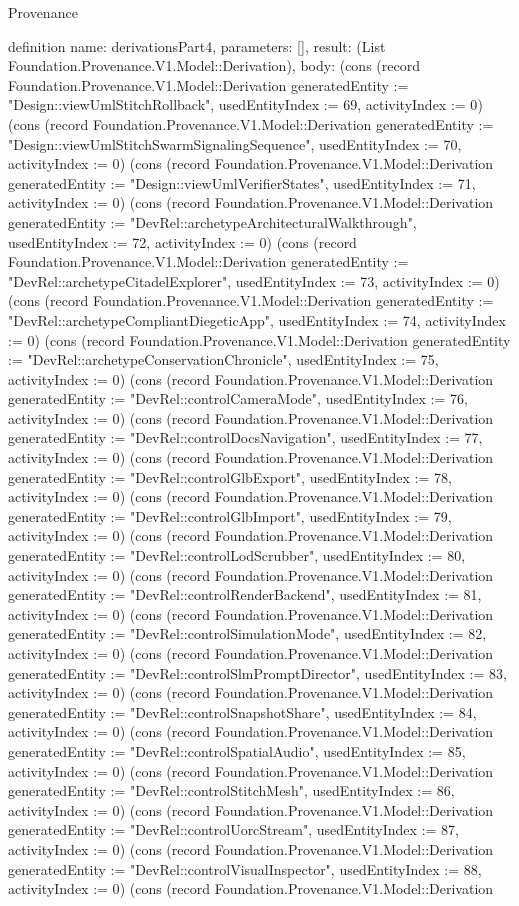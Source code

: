 \begin{lexlean}{Provenance}
\begin{semanticmodule}
definition{
  name: derivationsPart4,
  parameters: [],
  result: (List Foundation.Provenance.V1.Model::Derivation),
  body: (cons (record Foundation.Provenance.V1.Model::Derivation {generatedEntity := "Design::viewUmlStitchRollback", usedEntityIndex := 69, activityIndex := 0}) (cons (record Foundation.Provenance.V1.Model::Derivation {generatedEntity := "Design::viewUmlStitchSwarmSignalingSequence", usedEntityIndex := 70, activityIndex := 0}) (cons (record Foundation.Provenance.V1.Model::Derivation {generatedEntity := "Design::viewUmlVerifierStates", usedEntityIndex := 71, activityIndex := 0}) (cons (record Foundation.Provenance.V1.Model::Derivation {generatedEntity := "DevRel::archetypeArchitecturalWalkthrough", usedEntityIndex := 72, activityIndex := 0}) (cons (record Foundation.Provenance.V1.Model::Derivation {generatedEntity := "DevRel::archetypeCitadelExplorer", usedEntityIndex := 73, activityIndex := 0}) (cons (record Foundation.Provenance.V1.Model::Derivation {generatedEntity := "DevRel::archetypeCompliantDiegeticApp", usedEntityIndex := 74, activityIndex := 0}) (cons (record Foundation.Provenance.V1.Model::Derivation {generatedEntity := "DevRel::archetypeConservationChronicle", usedEntityIndex := 75, activityIndex := 0}) (cons (record Foundation.Provenance.V1.Model::Derivation {generatedEntity := "DevRel::controlCameraMode", usedEntityIndex := 76, activityIndex := 0}) (cons (record Foundation.Provenance.V1.Model::Derivation {generatedEntity := "DevRel::controlDocsNavigation", usedEntityIndex := 77, activityIndex := 0}) (cons (record Foundation.Provenance.V1.Model::Derivation {generatedEntity := "DevRel::controlGlbExport", usedEntityIndex := 78, activityIndex := 0}) (cons (record Foundation.Provenance.V1.Model::Derivation {generatedEntity := "DevRel::controlGlbImport", usedEntityIndex := 79, activityIndex := 0}) (cons (record Foundation.Provenance.V1.Model::Derivation {generatedEntity := "DevRel::controlLodScrubber", usedEntityIndex := 80, activityIndex := 0}) (cons (record Foundation.Provenance.V1.Model::Derivation {generatedEntity := "DevRel::controlRenderBackend", usedEntityIndex := 81, activityIndex := 0}) (cons (record Foundation.Provenance.V1.Model::Derivation {generatedEntity := "DevRel::controlSimulationMode", usedEntityIndex := 82, activityIndex := 0}) (cons (record Foundation.Provenance.V1.Model::Derivation {generatedEntity := "DevRel::controlSlmPromptDirector", usedEntityIndex := 83, activityIndex := 0}) (cons (record Foundation.Provenance.V1.Model::Derivation {generatedEntity := "DevRel::controlSnapshotShare", usedEntityIndex := 84, activityIndex := 0}) (cons (record Foundation.Provenance.V1.Model::Derivation {generatedEntity := "DevRel::controlSpatialAudio", usedEntityIndex := 85, activityIndex := 0}) (cons (record Foundation.Provenance.V1.Model::Derivation {generatedEntity := "DevRel::controlStitchMesh", usedEntityIndex := 86, activityIndex := 0}) (cons (record Foundation.Provenance.V1.Model::Derivation {generatedEntity := "DevRel::controlUorcStream", usedEntityIndex := 87, activityIndex := 0}) (cons (record Foundation.Provenance.V1.Model::Derivation {generatedEntity := "DevRel::controlVisualInspector", usedEntityIndex := 88, activityIndex := 0}) (cons (record Foundation.Provenance.V1.Model::Derivation }
\end{semanticmodule}
\end{lexlean}
